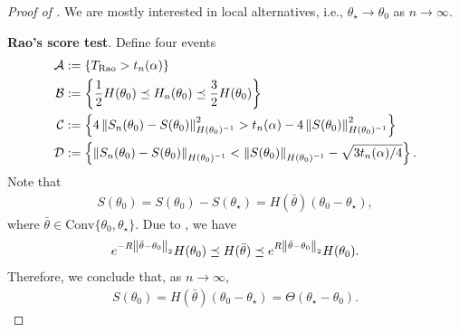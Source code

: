 \begin{proof}[Proof of ]
    We are mostly interested in local alternatives, i.e., $\theta_\star \rightarrow \theta_0$ as $n \rightarrow \infty$.

    \textbf{Rao's score test}. Define four events
    \begin{align*}
        \mathcal{A} &:= \{T_{\text{Rao}} > t_n(\alpha)\} \\
        \mathcal{B} &:= \left\{ \frac12 H(\theta_0) \preceq H_n(\theta_0) \preceq \frac32 H(\theta_0) \right\} \\
        \mathcal{C} &:= \left\{ 4 \left\lVert S_n(\theta_0) - S(\theta_0) \right\rVert_{H(\theta_0)^{-1}}^2 > t_n(\alpha) - 4 \left\lVert S(\theta_0) \right\rVert_{H(\theta_0)^{-1}}^2 \right\} \\
        \mathcal{D} &:= \left\{ \left\lVert S_n(\theta_0) - S(\theta_0) \right\rVert_{H(\theta_0)^{-1}} < \left\lVert S(\theta_0) \right\rVert_{H(\theta_0)^{-1}} - \sqrt{3t_n(\alpha)/4} \right\}.
    \end{align*}
    Note that
    \begin{align*}
        S(\theta_0) = S(\theta_0) - S(\theta_\star) = H(\bar \theta) (\theta_0 - \theta_\star),
    \end{align*}
    where $\bar \theta \in \mbox{Conv}\{\theta_0, \theta_\star\}$.
    Due to , we have
    \begin{align}\label{eq:hessian_order}
        e^{-R \left\lVert \bar \theta - \theta_0 \right\rVert_2} H(\theta_0) \preceq H(\bar \theta) \preceq e^{R \left\lVert \bar \theta - \theta_0 \right\rVert_2} H(\theta_0).
    \end{align}
    Therefore, we conclude that, as $n \rightarrow \infty$,
    \begin{align}\label{eq:score_order}
        S(\theta_0) = H(\bar \theta) (\theta_0 - \theta_\star) = \Theta(\theta_\star - \theta_0).
    \end{align}
    

\end{proof}

